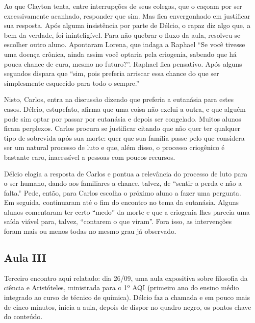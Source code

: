 \documentclass[12pt,a4paper]{article}
\begin{document}
    Ao que Clayton tenta, entre interrupções de seus colegas, que o caçoam por 
    ser excessivamente acanhado, responder que sim. Mas fica envergonhado em 
    justificar sua resposta. Após alguma insistência por parte de Délcio, 
    o rapaz diz algo que, a bem da verdade, foi ininteligível. Para não quebrar 
    o fluxo da aula, resolveu-se escolher outro aluno. Apontaram Lorena, que 
    indaga a Raphael ``Se você tivesse uma doença crônica, ainda assim 
    você optaria pela criogenia, sabendo que há pouca chance de cura, mesmo 
    no futuro?''. Raphael fica pensativo. Após alguns segundos dispara que 
    ``sim, pois preferia arriscar essa chance do que ser simplesmente 
    esquecido para todo o sempre.'' 
    
    Nisto, Carlos, entra na discussão dizendo que preferia a eutanásia para 
    estes casos. Délcio, estupefato, afirma que uma coisa não exclui a outra, 
    e que alguém pode sim optar por passar por eutanásia e depois ser congelado. 
    Muitos alunos ficam perplexos. Carlos procura se justificar citando que 
    não quer ter qualquer tipo de sobrevida após sua morte: quer que sua 
    família passe pelo que considera ser um natural processo de luto e que, 
    além disso, o processo criogênico é bastante caro, inacessível a pessoas 
    com poucos recursos. 
    
    Délcio elogia a resposta de Carlos e pontua a relevância do processo de 
    luto para o ser humano, dando aos familiares a chance, talvez, de 
    ``sentir a perda e não a falta.'' Pede, então, para Carlos escolha o próximo 
    aluno  a fazer uma pergunta. Em seguida, continuaram até o fim do 
    encontro no tema da eutanásia. Alguns alunos comentaram ter certo ``medo'' 
    da morte e que a criogenia lhes parecia uma saída viável para, talvez, 
    ``contarem o que viram''. Fora isso, as intervenções foram mais ou menos 
    todas no mesmo grau já observado. 
    
    \subsection*{Aula III}
    
    Terceiro encontro aqui relatado: dia 26/09, uma aula expositiva sobre 
    filosofia da ciência e Aristóteles, ministrada para o 1º AQI (primeiro ano
    do ensino médio integrado ao curso de técnico de química). Délcio faz a 
    chamada e em pouco mais de cinco minutos, inicia a aula, depois de dispor 
    no quadro negro, os pontos chave do conteúdo. 
    
\end{document}
